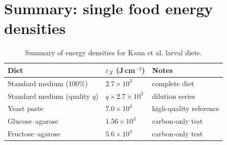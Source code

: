 \documentclass[11pt]{article}
\begin{document}
\section{Summary: single food energy densities}

\begin{table}[h]
\centering
\begin{tabular}{lll}
\toprule
Diet & $\varepsilon_X$ (J\,cm$^{-3}$) & Notes \\
\midrule
Standard medium (100\%) & $2.7\times10^{3}$ & complete diet \\
Standard medium (quality $q$) & $q\times 2.7\times10^{3}$ & dilution series \\
Yeast paste & $7.0\times10^{3}$ & high-quality reference \\
Glucose--agarose & $1.56\times10^{3}$ & carbon-only test \\
Fructose--agarose & $5.6\times10^{3}$ & carbon-only test \\
\bottomrule
\end{tabular}
\caption{Summary of energy densities for Kaun et al. larval diets.}
\label{tab:summary}
\end{table}
\end{document}

